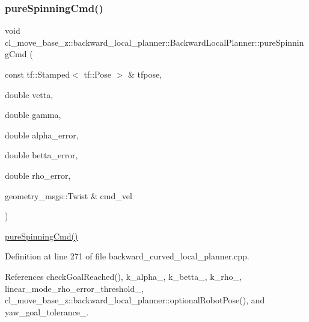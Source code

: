 \mbox{\label{classcl__move__base__z_1_1backward__local__planner_1_1BackwardLocalPlanner_aaa88a0a47e7cfd449c59518577599928}} 
\subsubsection{\texorpdfstring{pure\+Spinning\+Cmd()}{pureSpinningCmd()}}
{\footnotesize\ttfamily void cl\+\_\+move\+\_\+base\+\_\+z\+::backward\+\_\+local\+\_\+planner\+::\+Backward\+Local\+Planner\+::pure\+Spinning\+Cmd (\begin{DoxyParamCaption}\item[{const tf\+::\+Stamped$<$ tf\+::\+Pose $>$ \&}]{tfpose,  }\item[{double}]{vetta,  }\item[{double}]{gamma,  }\item[{double}]{alpha\+\_\+error,  }\item[{double}]{betta\+\_\+error,  }\item[{double}]{rho\+\_\+error,  }\item[{geometry\+\_\+msgs\+::\+Twist \&}]{cmd\+\_\+vel }\end{DoxyParamCaption})\hspace{0.3cm}{\ttfamily [private]}}

\hyperlink{classcl__move__base__z_1_1backward__local__planner_1_1BackwardLocalPlanner_aaa88a0a47e7cfd449c59518577599928}{pure\+Spinning\+Cmd()} 

Definition at line 271 of file backward\+\_\+curved\+\_\+local\+\_\+planner.\+cpp.



References check\+Goal\+Reached(), k\+\_\+alpha\+\_\+, k\+\_\+betta\+\_\+, k\+\_\+rho\+\_\+, linear\+\_\+mode\+\_\+rho\+\_\+error\+\_\+threshold\+\_\+, cl\+\_\+move\+\_\+base\+\_\+z\+::backward\+\_\+local\+\_\+planner\+::optional\+Robot\+Pose(), and yaw\+\_\+goal\+\_\+tolerance\+\_\+.



